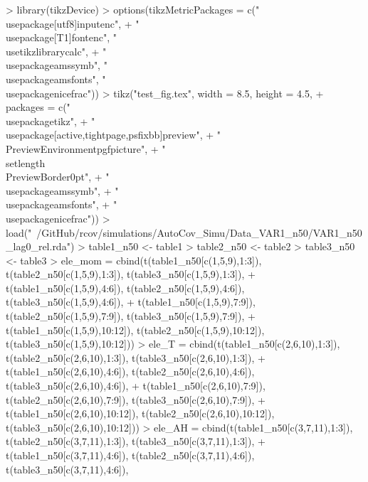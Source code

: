 \documentclass{article}
\begin{document}


\begin{Schunk}
\begin{Sinput}
> library(tikzDevice)
> options(tikzMetricPackages = c("\\usepackage[utf8]{inputenc}",
+     "\\usepackage[T1]{fontenc}", "\\usetikzlibrary{calc}",
+     "\\usepackage{amssymb}", "\\usepackage{amsfonts}", "\\usepackage{nicefrac}"))
> tikz("test_fig.tex", width = 8.5, height = 4.5,
+      packages = c("\\usepackage{tikz}",
+                  "\\usepackage[active,tightpage,psfixbb]{preview}",
+                  "\\PreviewEnvironment{pgfpicture}",
+                  "\\setlength\\PreviewBorder{0pt}",
+                  "\\usepackage{amssymb}",
+                  "\\usepackage{amsfonts}",
+                  "\\usepackage{nicefrac}"))
> load("~/GitHub/rcov/simulations/AutoCov_Simu/Data_VAR1_n50/VAR1_n50_lag0_rel.rda")
> table1_n50 <- table1
> table2_n50 <- table2
> table3_n50 <- table3
> ele_mom = cbind(t(table1_n50[c(1,5,9),1:3]), t(table2_n50[c(1,5,9),1:3]), t(table3_n50[c(1,5,9),1:3]),
+                 t(table1_n50[c(1,5,9),4:6]), t(table2_n50[c(1,5,9),4:6]), t(table3_n50[c(1,5,9),4:6]),
+                 t(table1_n50[c(1,5,9),7:9]), t(table2_n50[c(1,5,9),7:9]), t(table3_n50[c(1,5,9),7:9]),
+                 t(table1_n50[c(1,5,9),10:12]), t(table2_n50[c(1,5,9),10:12]), t(table3_n50[c(1,5,9),10:12]))
> ele_T = cbind(t(table1_n50[c(2,6,10),1:3]), t(table2_n50[c(2,6,10),1:3]), t(table3_n50[c(2,6,10),1:3]),
+               t(table1_n50[c(2,6,10),4:6]), t(table2_n50[c(2,6,10),4:6]), t(table3_n50[c(2,6,10),4:6]),
+               t(table1_n50[c(2,6,10),7:9]), t(table2_n50[c(2,6,10),7:9]), t(table3_n50[c(2,6,10),7:9]),
+               t(table1_n50[c(2,6,10),10:12]), t(table2_n50[c(2,6,10),10:12]), t(table3_n50[c(2,6,10),10:12]))
> ele_AH = cbind(t(table1_n50[c(3,7,11),1:3]), t(table2_n50[c(3,7,11),1:3]), t(table3_n50[c(3,7,11),1:3]),
+                t(table1_n50[c(3,7,11),4:6]), t(table2_n50[c(3,7,11),4:6]), t(table3_n50[c(3,7,11),4:6]),

\end{Sinput}
\end{Schunk}
\end{document}
